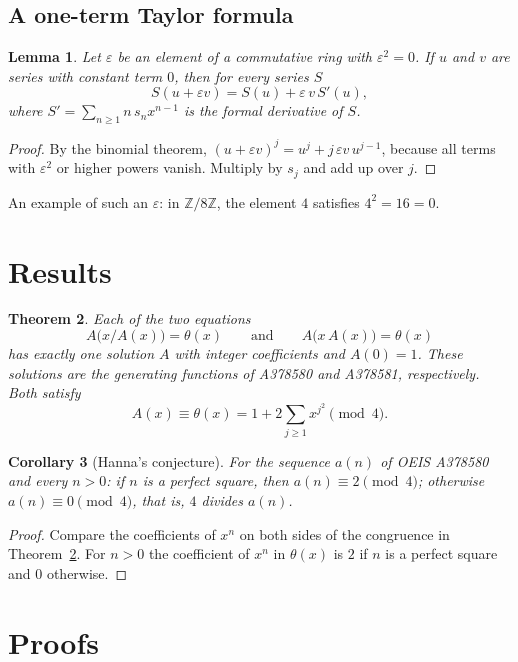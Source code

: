 \documentclass[11pt,a4paper]{article}
\newtheorem{theorem}{Theorem}[section]
\newtheorem{lemma}[theorem]{Lemma}
\newtheorem{corollary}[theorem]{Corollary}
\theoremstyle{definition}
\theoremstyle{remark}
\newcommand{\Z}{\mathbb{Z}}
\begin{document}
\subsection{A one-term Taylor formula}
\begin{lemma}\label{lem:taylor}
Let $\varepsilon$ be an element of a commutative ring with $\varepsilon^2=0$. If $u$ and $v$ are series with constant
term $0$, then for every series $S$
\[
S(u+\varepsilon v)=S(u)+\varepsilon\,v\,S'(u),
\]
where $S'=\sum_{n\ge1}n\,s_nx^{n-1}$ is the formal derivative of $S$.
\end{lemma}

\begin{proof}
By the binomial theorem, $(u+\varepsilon v)^j=u^j+j\,\varepsilon v\,u^{j-1}$, because all terms with
$\varepsilon^2$ or higher powers vanish. Multiply by $s_j$ and add up over $j$.
\end{proof}
An example of such an $\varepsilon$: in $\Z/8\Z$, the element $4$ satisfies $4^2=16=0$.

\section{Results}\label{sec:results}

\begin{theorem}\label{thm:main}
Each of the two equations
\[
A\bigl(x/A(x)\bigr)=\theta(x)\qquad\text{and}\qquad A\bigl(x\,A(x)\bigr)=\theta(x)
\]
has exactly one solution $A$ with integer coefficients and $A(0)=1$. These solutions are the generating functions of
A378580 and A378581, respectively. Both satisfy
\[
A(x)\equiv\theta(x)=1+2\sum_{j\ge1}x^{j^2}\pmod 4 .
\]
\end{theorem}

\begin{corollary}[Hanna's conjecture]\label{cor:conj}
For the sequence $a(n)$ of OEIS A378580 and every $n>0$: if $n$ is a perfect square, then $a(n)\equiv2\pmod4$;
otherwise $a(n)\equiv0\pmod4$, that is, $4$ divides $a(n)$.
\end{corollary}

\begin{proof}
Compare the coefficients of $x^n$ on both sides of the congruence in Theorem~\ref{thm:main}. For $n>0$ the coefficient
of $x^n$ in $\theta(x)$ is $2$ if $n$ is a perfect square and $0$ otherwise.
\end{proof}

\section{Proofs}\label{sec:proofs}
\end{document}
